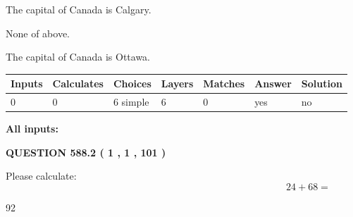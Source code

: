 \documentclass[12pt]{article}
\begin{document}
 
The capital of Canada is Calgary.
 
 
 None of above.
 
 
\noindent{}
 
 
The capital of Canada is Ottawa.
 
 
\noindent{}
 
 
   
   
   
   
\noindent\begin{tabular}{|l|l|l|l|l|l|l|}
 \hline
Inputs & Calculates & Choices & Layers & Matches & Answer & Solution \\ \hline
 0  & 
 0  & 
 6
  simple  
  & 
 6  & 
 0  & 
  yes & 
  no 
  \\ \hline
 \end{tabular}
   
   
   
   
\noindent{}
   
   
   
   
\noindent\vspace{0.1in}\hspace{-0.08in} {\textbf{\Large{All inputs: }}}
   
   
  
\vspace{0.2in}
  
{\textbf{\Large{QUESTION
588.2 
 ( 1 , 1 , 101 )
}}}
  
  
 
Please calculate:
\begin{equation}
24 +  %
68 = \nonumber
\end{equation}
 
 
 
\noindent{}
 
 

92
 
 
\noindent{}
 
 

 
 
 
\noindent{}
 
\end{document}
